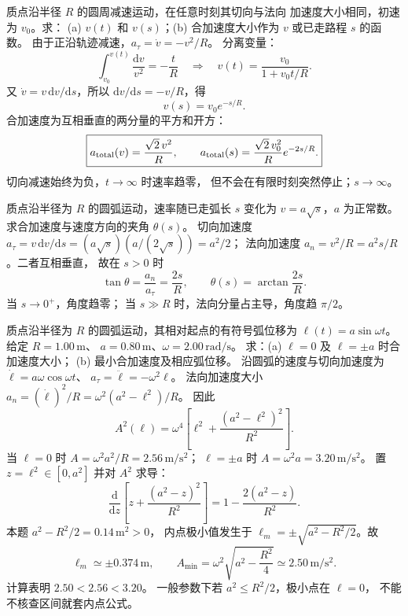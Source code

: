 质点沿半径 $R$ 的圆周减速运动，在任意时刻其切向与法向
加速度大小相同，初速为 $v_0$。求：
(a) $v(t)$ 和 $v(s)$；(b) 合加速度大小作为 $v$ 或已走路程 $s$ 的函数。
\exsolution
由于正沿轨迹减速，$a_\tau=\dot v=-v^2/R$。
分离变量：
\[
 \int_{v_0}^{v(t)}\frac{\mathrm dv}{v^2}=-\frac tR
 \quad\Longrightarrow\quad
 \boxed{v(t)=\frac{v_0}{1+v_0t/R}}.
\]
又 $\dot v=v\,\mathrm dv/\mathrm ds$，所以
$\mathrm dv/\mathrm ds=-v/R$，得
\[
 \boxed{v(s)=v_0e^{-s/R}}.
\]
合加速度为互相垂直的两分量的平方和开方：
\[
 \boxed{a_{\rm total}(v)=\frac{\sqrt2\,v^2}{R},\qquad
 a_{\rm total}(s)=\frac{\sqrt2\,v_0^2}{R}e^{-2s/R}.}
\]
\excheck 切向减速始终为负，$t\to\infty$ 时速率趋零，
但不会在有限时刻突然停止；$s\to\infty$。

质点沿半径为 $R$ 的圆弧运动，速率随已走弧长 $s$ 变化为
$v=a\sqrt s$，$a$ 为正常数。求合加速度与速度方向的夹角 $\theta(s)$。
\exsolution
切向加速度 $a_\tau=v\,\mathrm dv/\mathrm ds
 =(a\sqrt s)(a/(2\sqrt s))=a^2/2$；
法向加速度 $a_n=v^2/R=a^2s/R$。二者互相垂直，
故在 $s>0$ 时
\[
 \boxed{\tan\theta=\frac{a_n}{a_\tau}=\frac{2s}{R},
 \qquad \theta(s)=\arctan\frac{2s}{R}.}
\]
\excheck 当 $s\to0^+$，角度趋零；
当 $s\gg R$ 时，法向分量占主导，角度趋 $\pi/2$。

质点沿半径为 $R$ 的圆弧运动，其相对起点的有符号弧位移为
$\ell(t)=a\sin\omega t$。给定 $R=1.00\,\mathrm m$、
$a=0.80\,\mathrm m$、$\omega=2.00\,\mathrm{rad/s}$。
求：(a) $\ell=0$ 及 $\ell=\pm a$ 时合加速度大小；
(b) 最小合加速度及相应弧位移。
\exsolution
沿圆弧的速度与切向加速度为
$\dot\ell=a\omega\cos\omega t$、
$a_\tau=\ddot\ell=-\omega^2\ell$。
法向加速度大小
$a_n=(\dot\ell)^2/R=\omega^2(a^2-\ell^2)/R$。
因此
\[
 A^2(\ell)=\omega^4\left[
 \ell^2+\frac{(a^2-\ell^2)^2}{R^2}\right].
\]
当 $\ell=0$ 时 $A=\omega^2a^2/R=2.56\,\mathrm{m/s^2}$；
$\ell=\pm a$ 时 $A=\omega^2a=3.20\,\mathrm{m/s^2}$。
置 $z=\ell^2\in[0,a^2]$ 并对 $A^2$ 求导：
\[
 \frac{\mathrm d}{\mathrm dz}
 \left[z+\frac{(a^2-z)^2}{R^2}\right]
 =1-\frac{2(a^2-z)}{R^2}.
\]
本题 $a^2-R^2/2=0.14\,\mathrm{m^2}>0$，
内点极小值发生于
$\ell_m=\pm\sqrt{a^2-R^2/2}$。故
\[
 \boxed{\ell_m\simeq\pm0.374\,\mathrm m,\qquad
 A_{\min}=\omega^2\sqrt{a^2-\frac{R^2}{4}}
 \simeq2.50\,\mathrm{m/s^2}.}
\]
\excheck 计算表明 $2.50<2.56<3.20$。
一般参数下若 $a^2\le R^2/2$，极小点在 $\ell=0$，
不能不核查区间就套内点公式。
